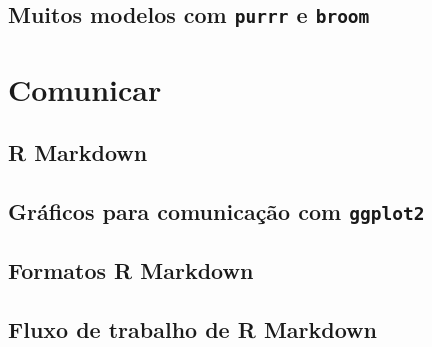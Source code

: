 \documentclass[
]{latex/krantz}
\theoremstyle{definition}
\theoremstyle{definition}
\theoremstyle{definition}
\theoremstyle{definition}
\theoremstyle{remark}
\begin{document}
\hypertarget{muitos-modelos-com-purrr-e-broom}{%
\chapter{\texorpdfstring{Muitos modelos com \texttt{purrr} e \texttt{broom}}{Muitos modelos com purrr e broom}}\label{muitos-modelos-com-purrr-e-broom}}

\hypertarget{part-comunicar}{%
\part{Comunicar}\label{part-comunicar}}

\hypertarget{r-markdown}{%
\chapter{R Markdown}\label{r-markdown}}

\hypertarget{gruxe1ficos-para-comunicauxe7uxe3o-com-ggplot2}{%
\chapter{\texorpdfstring{Gráficos para comunicação com \texttt{ggplot2}}{Gráficos para comunicação com ggplot2}}\label{gruxe1ficos-para-comunicauxe7uxe3o-com-ggplot2}}

\hypertarget{formatos-r-markdown}{%
\chapter{Formatos R Markdown}\label{formatos-r-markdown}}

\hypertarget{fluxo-de-trabalho-de-r-markdown}{%
\chapter{Fluxo de trabalho de R Markdown}\label{fluxo-de-trabalho-de-r-markdown}}

  

\printindex
\end{document}
